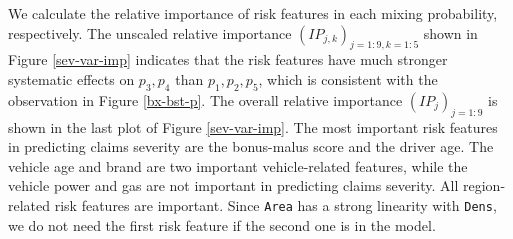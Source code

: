 \documentclass[11pt]{article}
\numberwithin{equation}{section}
\begin{document}
We calculate the relative importance of risk features in each mixing probability, respectively. 
The unscaled relative importance $(IP_{j,k})_{j=1:9,k=1:5}$ shown in Figure \ref{sev-var-imp}  indicates that the risk features have much stronger systematic effects on $p_3,p_4$ than $p_1,p_2,p_5$, which is consistent with the observation in Figure \ref{bx-bst-p}.
The overall relative importance $(IP_{j})_{j=1:9}$ is shown in the last plot of Figure \ref{sev-var-imp}.
The most important risk features in predicting claims severity are the bonus-malus score and the driver age.   
The vehicle age and brand are two important vehicle-related features, while the vehicle power and gas are not important in predicting claims severity.
All region-related risk features are important. Since {\tt Area} has a strong linearity with {\tt Dens}, we do not need the first risk feature if the second one is in the model.
\end{document}
